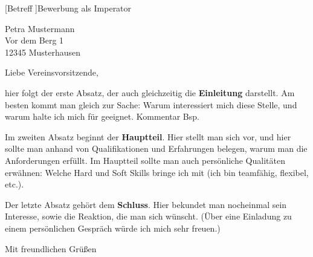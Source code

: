 \documentclass[DINmtext]{scrlttr2}%
\begin{document}
[Betreff ]{Bewerbung als Imperator}

\begin{letter}{%
Petra Mustermann\\
Vor dem Berg 1\\
12345 Musterhausen%
}
\opening{Liebe Vereinsvorsitzende,}

hier folgt der erste Absatz, der auch gleichzeitig die \textbf{Einleitung} darstellt. Am besten kommt man gleich zur Sache: Warum interessiert mich diese Stelle, und warum halte ich mich für geeignet.  Kommentar \glqq Bsp\grqq .

Im zweiten Absatz beginnt der \textbf{Hauptteil}. Hier stellt man sich vor, und hier sollte man anhand von Qualifikationen und Erfahrungen belegen, warum man die Anforderungen erfüllt. Im Hauptteil sollte man auch persönliche Qualitäten erwähnen: Welche Hard und Soft Skills bringe ich mit (ich bin teamfähig, flexibel, etc.).

Der letzte Absatz gehört dem \textbf{Schluss}. Hier bekundet man nocheinmal sein Interesse, sowie die Reaktion, die man sich wünscht. (Über eine Einladung zu einem persönlichen Gespräch würde ich mich sehr freuen.)

Mit freundlichen Grüßen\\\sig
\encl{}
\end{letter}
\end{document}
